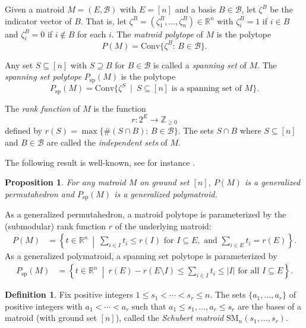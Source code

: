 \documentclass{amsart}
\newtheorem{proposition}[theorem]{Proposition}
\theoremstyle{definition}
\newtheorem{definition}[theorem]{Definition}
\theoremstyle{named}
\begin{document}
	Given a matroid $M=(E,\mathcal{B})$ with $E=[n]$ and a basis $B\in\mathcal{B}$, let $\zeta^B$ be the indicator vector of $B$. That is, let $\zeta^B=(\zeta_1^B,\ldots, \zeta_n^B)\in\mathbb{R}^n$ with $\zeta_i^B=1$ if $i\in B$ and $\zeta_i^B=0$ if $i\notin B$ for each $i$. The \emph{matroid polytope} of $M$ is the polytope 
	\[P(M)=\mathrm{Conv}\{\zeta^B:\,B\in\mathcal{B} \}.\]
	
	Any set $S\subseteq [n]$ with $S\supseteq B$ for $B\in\mathcal{B}$ is called a \emph{spanning set} of $M$.
	The \emph{spanning set polytope} $P_{\mathrm{sp}}(M)$ is the polytope
	\[P_\mathrm{sp}(M)=\mathrm{Conv}\{\zeta^S\ \mid \ S\subseteq [n] \mbox{ is a spanning set of } M \}.\]
	
	The \emph{rank function} of $M$ is the function
	\[r:2^{E}\to \mathbb{Z}_{\geq 0}\] defined by $r(S)=\max\{\#(S\cap B):\, B\in \mathcal{B} \}$. The sets $S\cap B$ where $S\subseteq [n]$ and $B\in\mathcal{B}$ are called the \emph{independent sets} of $M$. 
	
	The following result is well-known, see for instance \cite{frank, Schrijver}.
	\begin{proposition}
		\label{prop:matroidgps}
		For any matroid $M$ on ground set $[n]$, $P(M)$ is a generalized permutahedron and $P_{\mathrm{sp}}(M)$ is a generalized polymatroid.
	\end{proposition}

	As a generalized permutahedron, a matroid polytope is parameterized by the (submodular) rank function $r$ of the underlying matroid:
	\begin{align*}
	P(M)&=\left\{ {t}\in\mathbb{R}^n \ \middle| \ \sum_{i\in I}{t_i}\leq r(I) \mbox{ for } I\subseteq E, \mbox{ and } \sum_{i\in E}{t_i}=r(E) \right\}.
	\end{align*}
	As a generalized polymatroid, a spanning set polytope is parameterized by
	\begin{align*}
	P_{\mathrm{sp}}(M)&=\left\{ {t}\in\mathbb{R}^n \ \middle| \ r(E)-r(E\setminus I) \leq \sum_{i\in I}{t_i}\leq |I| \mbox{ for all } I\subseteq E \right\}.
	\end{align*}
	
	\begin{definition}
		\label{def:schubert-matroids}
		Fix positive integers $1 \leq s_1 < \cdots < s_r \leq n$. The sets $\{a_1, \ldots, a_r\}$ of positive integers with $a_1<\cdots<a_r$ such that $a_1 \leq s_1, \ldots, a_r \leq s_r$ are the bases of a matroid (with ground set $[n]$), 
		called the \emph{Schubert matroid} $\mathrm{SM}_n(s_1, \ldots, s_r)$.
	\end{definition}
	
\end{document}
